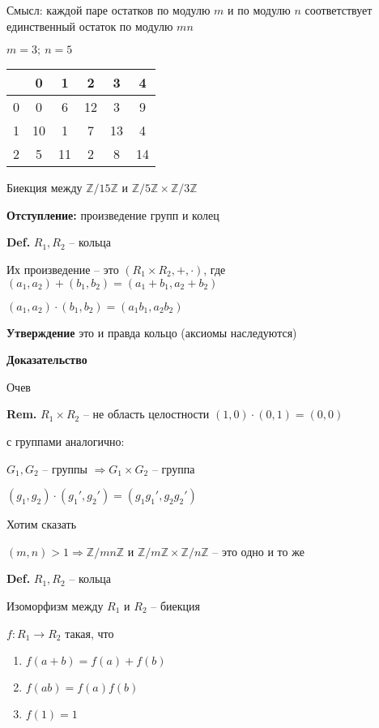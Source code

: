 \documentclass[14pt, letter paper]{article}
\begin{document}
Смысл: каждой паре остатков по модулю $m$ и по модулю $n$ соответствует единственный остаток по модулю $mn$

$m = 3;\ n = 5$

\begin{center}
    \begin{tabular}{|c|c|c|c|c|c|}
        \hline
        & 0 & 1 & 2 & 3 & 4 \\
        \hline
        0 & 0 & 6 & 12 & 3 & 9 \\
        \hline
        1 & 10 & 1 & 7 & 13 & 4 \\
        \hline
        2 & 5 & 11 & 2 & 8 & 14 \\
        \hline
    \end{tabular}
\end{center}

Биекция между $\mathds{Z}/15\mathds{Z}$ и $\mathds{Z}/5\mathds{Z} \times \mathds{Z}/3\mathds{Z}$

\textbf{Отступление:} произведение групп и колец

\textbf{Def.} $R_1, R_2$ -- кольца

Их произведение -- это $(R_1 \times R_2, +, \cdot)$, где $(a_1,a_2) + (b_1,b_2) = (a_1 + b_1, a_2 + b_2)$

$(a_1, a_2) \cdot (b_1, b_2) = (a_1b_1, a_2b_2)$

\textbf{Утверждение} это и правда кольцо (аксиомы наследуются)

\begin{center}
    \textbf{Доказательство}
\end{center}

Очев

\textbf{Rem.} $R_1 \times R_2$ -- не область целостности $(1,0) \cdot (0, 1) = (0, 0)$

с группами аналогично:

$G_1, G_2$ -- группы $\Rightarrow G_1 \times G_2$ -- группа

$(g_1,g_2)\cdot(g_1',g_2') = (g_1g_1',g_2g_2')$

Хотим сказать

$(m,n) > 1 \Rightarrow \mathds{Z}/mn\mathds{Z}$ и $\mathds{Z}/m\mathds{Z} \times \mathds{Z}/n\mathds{Z}$ -- это одно и то же

\textbf{Def.} $R_1, R_2$ -- кольца

Изоморфизм между $R_1$ и $R_2$ -- биекция

$f:R_1 \rightarrow R_2$ такая, что

\begin{enumerate}
    \item $f(a + b) = f(a) + f(b)$
    \item $f(ab) = f(a)f(b)$
    \item $f(1)=1$
\end{enumerate}
\end{document}
